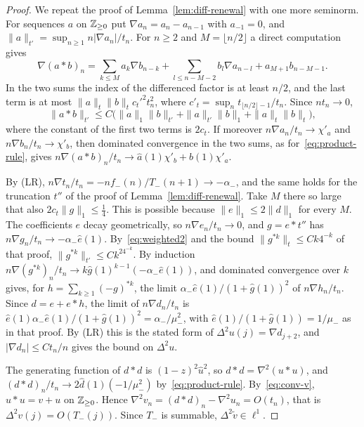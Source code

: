 \begin{proof}
We repeat the proof of Lemma~\ref{lem:diff-renewal} with one more seminorm. For sequences $a$
on $\mathbb{Z}_{\ge0}$ put $\nabla a_n=a_n-a_{n-1}$ with $a_{-1}=0$, and
$\|a\|_{t'}=\sup_{n\ge1}n|\nabla a_n|/t_n$. For $n\ge2$ and $M=\lfloor n/2\rfloor$ a direct
computation gives
\[
 \nabla(a*b)_n=\sum_{k\le M}a_k\nabla b_{n-k}+\sum_{l\le n-M-2}b_l\nabla a_{n-l}+a_{M+1}b_{n-M-1}.
\]
In the two sums the index of the differenced factor is at least $n/2$, and the last term is at
most $\|a\|_t\|b\|_tc_t'^2t_n^2$, where $c'_t=\sup_nt_{\lfloor n/2\rfloor-1}/t_n$. Since
$nt_n\to0$,
\begin{equation}\label{eq:weighted2}
 \|a*b\|_{t'}\le C\bigl(\|a\|_1\|b\|_{t'}+\|a\|_{t'}\|b\|_1+\|a\|_t\|b\|_t\bigr),
\end{equation}
where the constant of the first two terms is $2c_t$. If moreover $n\nabla a_n/t_n\to\chi'_a$ and
$n\nabla b_n/t_n\to\chi'_b$, then dominated convergence in the two sums, as
for~\eqref{eq:product-rule}, gives $n\nabla(a*b)_n/t_n\to\hat a(1)\chi'_b+\hat b(1)\chi'_a$.

By (LR), $n\nabla t_n/t_n=-nf_\minus(n)/T_\minus(n+1)\to-\alpha_\minus$, and the same holds for
the truncation $t''$ of the proof of Lemma~\ref{lem:diff-renewal}. Take $M$ there so large that
also $2c_t\|g\|_1\le\frac14$. This is possible because
$\|e\|_1\le2\|d\|_1$ for every $M$. The coefficients $e$ decay geometrically, so
$n\nabla e_n/t_n\to0$, and $g=e*t''$ has $n\nabla g_n/t_n\to-\alpha_\minus\hat e(1)$.
By~\eqref{eq:weighted2} and the bound $\|g^{*k}\|_t\le Ck4^{-k}$ of that proof,
$\|g^{*k}\|_{t'}\le Ck^24^{-k}$. By induction
$n\nabla(g^{*k})_n/t_n\to k\hat g(1)^{k-1}(-\alpha_\minus\hat e(1))$, and dominated convergence
over $k$ gives, for $h=\sum_{k\ge1}(-g)^{*k}$, the limit $\alpha_\minus\hat e(1)/(1+\hat g(1))^2$
of $n\nabla h_n/t_n$. Since $d=e+e*h$, the limit of $n\nabla d_n/t_n$ is
$\hat e(1)\alpha_\minus\hat e(1)/(1+\hat g(1))^2=\alpha_\minus/\mu_\minus^2$, with
$\hat e(1)/(1+\hat g(1))=1/\mu_\minus$ as in that proof. By (LR) this is the stated form of
$\Delta^2u(j)=\nabla d_{j+2}$, and $|\nabla d_n|\le Ct_n/n$ gives the bound on $\Delta^2u$.

The generating function of $d*d$ is $(1-z)^2\hat u^2$, so $d*d=\nabla^2(u*u)$, and
$(d*d)_n/t_n\to2\hat d(1)(-1/\mu_\minus^2)$ by~\eqref{eq:product-rule}. By~\eqref{eq:conv-v},
$u*u=v+u$ on $\mathbb{Z}_{\ge0}$. Hence $\nabla^2v_n=(d*d)_n-\nabla^2u_n=O(t_n)$, that is
$\Delta^2v(j)=O(T_\minus(j))$. Since $T_\minus$ is summable, $\Delta^2\tilde v\in\ell^1$.
\end{proof}

